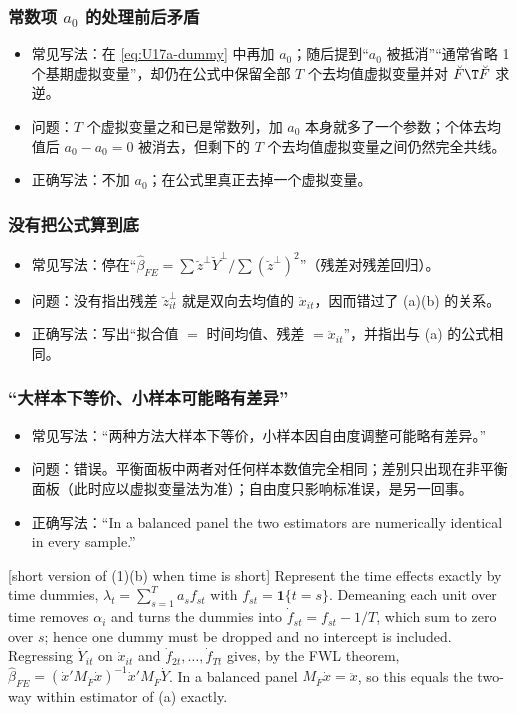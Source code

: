 \subsubsection{常数项 \texorpdfstring{$a_0$}{a\_0} 的处理前后矛盾}
\begin{itemize}
  \item 常见写法：在 \eqref{eq:U17a-dummy} 中再加 $a_0$；随后提到“$a_0$ 被抵消”“通常省略 1 个基期虚拟变量”，却仍在公式中保留全部 $T$ 个去均值虚拟变量并对 $\breve F\T\breve F$ 求逆。
  \item 问题：$T$ 个虚拟变量之和已是常数列，加 $a_0$ 本身就多了一个参数；个体去均值后 $a_0-a_0=0$ 被消去，但剩下的 $T$ 个去均值虚拟变量之间仍然完全共线。
  \item 正确写法：不加 $a_0$；在公式里真正去掉一个虚拟变量。
\end{itemize}

\subsubsection{没有把公式算到底}
\begin{itemize}
  \item 常见写法：停在“$\hat\beta_{FE}=\sum\breve z^{\perp}\breve Y^{\perp}/\sum(\breve z^{\perp})^2$”（残差对残差回归）。
  \item 问题：没有指出残差 $\breve z^{\perp}_{it}$ 就是双向去均值的 $\ddot x_{it}$，因而错过了 (a)(b) 的关系。
  \item 正确写法：写出“拟合值 $=$ 时间均值、残差 $=\ddot x_{it}$”，并指出与 (a) 的公式相同。
\end{itemize}

\subsubsection{“大样本下等价、小样本可能略有差异”}
\begin{itemize}
  \item 常见写法：“两种方法大样本下等价，小样本因自由度调整可能略有差异。”
  \item 问题：错误。平衡面板中两者对任何样本数值完全相同；差别只出现在非平衡面板（此时应以虚拟变量法为准）；自由度只影响标准误，是另一回事。
  \item 正确写法：“In a balanced panel the two estimators are numerically identical in every sample.”
\end{itemize}

\begin{english}[short version of (1)(b) when time is short]
Represent the time effects exactly by time dummies, $\lambda_t=\sum_{s=1}^Ta_sf_{st}$ with $f_{st}=\mathbf{1}\{t=s\}$. Demeaning each unit over time removes $\alpha_i$ and turns the dummies into $\dot f_{st}=f_{st}-1/T$, which sum to zero over $s$; hence one dummy must be dropped and no intercept is included. Regressing $\dot Y_{it}$ on $\dot x_{it}$ and $\dot f_{2t},\dots,\dot f_{Tt}$ gives, by the FWL theorem, $\hat\beta_{FE}=(\dot x'M_{\dot F}\dot x)^{-1}\dot x'M_{\dot F}\dot Y$. In a balanced panel $M_{\dot F}\dot x=\ddot x$, so this equals the two-way within estimator of (a) exactly.
\end{english}

